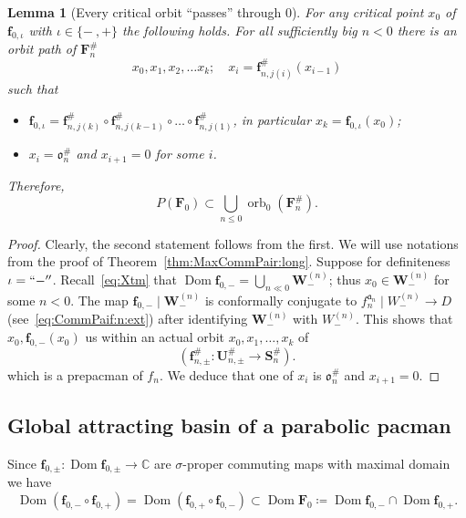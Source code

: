 \documentclass[]{amsart}
\newcommand{\Dom}{\operatorname {Dom}}
\renewcommand{\sp}{{\ \ }}
\newcommand{\bF}{{\mathbf F}}
\newcommand{\bW}{{\mathbf W}}
\newcommand{\bS}{{\mathbf S}}
\newcommand{\bU}{{\mathbf U}}
\newcommand{\bbf}{{\mathbf f}}
\renewcommand{\aa}{{\mathfrak{a}}}
\newcommand\crt{{\mathfrak o}}
\newcommand{\C}{\mathbb{C}}
\newtheorem{lem}[thm]{Lemma}
\theoremstyle{remark}
\numberwithin{equation}{section}
\theoremstyle{definition}
\newcommand{\orb}{\operatorname{orb}}
\begin{document}
 
\begin{lem}[Every critical orbit ``passes'' through $0$]
\label{lem:CritOrbPasses0}
For any critical point $x_0$ of $\bbf_{0,\iota}$ with $\iota\in\{-~,+\}$ the following holds. For all sufficiently big $n< 0$ there is an orbit path of $\bF_n^{\#}$ 
\begin{equation}
\label{eq:lem:CritOrbPasses0:OrbPath}
 x_0, x_1,x_2,\dots x_k;\;\; \sp x_{i}=\bbf^{\#}_{n, j(i)} (x_{i-1})
\end{equation}
such that 
\begin{itemize}
\item  $ \bbf_{0,\iota}= \bbf^{\#}_{n, j(k)}\circ \bbf^{\#}_{n, j(k-1)}\circ \dots \circ \bbf^{\#}_{n, j(1)}$, in particular $x_{k}= \bbf_{0,\iota}(x_0)$; 
\item $x_i=\crt_n^{\#}$ and $x_{i+1}=0$  for some $i$. 
\end{itemize}


Therefore,
\[P(\bF_{0})\subset \bigcup_{n\le 0} \orb_0\left( \bF^{\#}_{n}\right).\]
\end{lem}

\begin{proof}
Clearly, the second statement follows from the first. We will use notations from the proof of Theorem~\ref{thm:MaxCommPair:long}. Suppose for definiteness $\iota=``-''$. Recall~\eqref{eq:Xtm} that $\displaystyle\Dom \bbf_{0,-} =\bigcup_{n\ll 0}  \bW^{(n)}_{-} $; thus $x_0\in  \bW^{(n)}_{-} $ for some $n< 0$. The map $\bbf_{0,-}\mid  \bW^{(n)}_{-}$ is conformally conjugate to $f_{n}^{\aa_n}\mid W^{(n)}_-\to D$  (see~\eqref{eq:CommPaif:n:ext}) after identifying $ \bW^{(n)}_{-}$ with $W^{(n)}_{-}$. 
This shows that $x_0,  \bbf_{0,-}(x_0)$ us within an actual orbit $x_0, x_1,\dots, x_k$ of 
\[
(\bbf^\#_{n,\pm}\colon \bU^{\#}_{n,\pm}\to \bS^{\#}_n).
\]which is a prepacman of $f_n$.
We deduce that one of $x_i$ is $\crt_n^{\#}$ and  $x_{i+1}=0$.
\end{proof}






\subsection{Global attracting basin of a parabolic pacman}
\label{ss:AttrFlow}
Since $\bbf_{0,\pm}\colon \Dom\bbf_{0,\pm}\to \C$ are $\sigma$-proper commuting maps with maximal domain we have
\begin{equation}
\label{eq: dom f_0 pm}
\Dom(\bbf_{0,-}\circ \bbf_{0,+})=\Dom(\bbf_{0,+}\circ \bbf_{0,-})\subset \Dom \bF_0\coloneqq  \Dom \bbf_{0,-} \cap  \Dom \bbf_{0,+}.
\end{equation}
\end{document}
